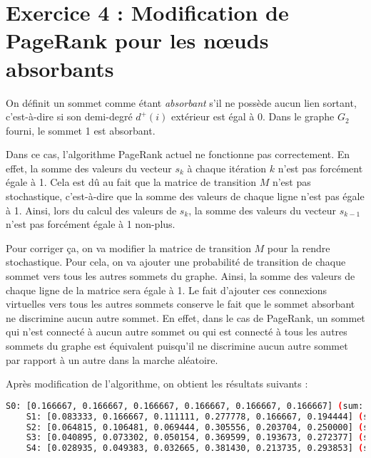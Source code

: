 \section{Exercice 4 : Modification de PageRank pour les nœuds absorbants}
On définit un sommet comme étant \textit{absorbant} s'il ne possède aucun lien sortant, c'est-à-dire si son demi-degré $d^+(i)$ extérieur est égal à 0. Dans le graphe $G_2$ fourni, le sommet 1 est absorbant.

Dans ce cas, l'algorithme PageRank actuel ne fonctionne pas correctement. En effet, la somme des valeurs du vecteur $s_k$ à chaque itération $k$ n'est pas forcément égale à 1. Cela est dû au fait que la matrice de transition $M$ n'est pas stochastique, c'est-à-dire que la somme des valeurs de chaque ligne n'est pas égale à 1. Ainsi, lors du calcul des valeurs de $s_k$, la somme des valeurs du vecteur $s_{k-1}$ n'est pas forcément égale à 1 non-plus.

Pour corriger ça, on va modifier la matrice de transition $M$ pour la rendre stochastique. Pour cela, on va ajouter une probabilité de transition de chaque sommet vers tous les autres sommets du graphe. Ainsi, la somme des valeurs de chaque ligne de la matrice sera égale à 1. Le fait d'ajouter ces connexions virtuelles vers tous les autres sommets conserve le fait que le sommet absorbant ne discrimine aucun autre sommet. En effet, dans le cas de PageRank, un sommet qui n'est connecté à aucun autre sommet ou qui est connecté à tous les autres sommets du graphe est équivalent puisqu'il ne discrimine aucun autre sommet par rapport à un autre dans la marche aléatoire.

Après modification de l'algorithme, on obtient les résultats suivants :

\begin{minipage}{\dimexpr\linewidth-20pt}
    \begin{lstlisting}[language=bash, caption={Résultat de l'algorithme PageRank sur le graphe $G_2$ fourni, pour $k = 4$, avec la somme des valeurs du vecteur $s_k$ à chaque itération $k$.}]
    S0: [0.166667, 0.166667, 0.166667, 0.166667, 0.166667, 0.166667] (sum: 1.000000)
    S1: [0.083333, 0.166667, 0.111111, 0.277778, 0.166667, 0.194444] (sum: 1.000000)
    S2: [0.064815, 0.106481, 0.069444, 0.305556, 0.203704, 0.250000] (sum: 1.000000)
    S3: [0.040895, 0.073302, 0.050154, 0.369599, 0.193673, 0.272377] (sum: 1.000000)
    S4: [0.028935, 0.049383, 0.032665, 0.381430, 0.213735, 0.293853] (sum: 1.000000)
    \end{lstlisting}
\end{minipage}


